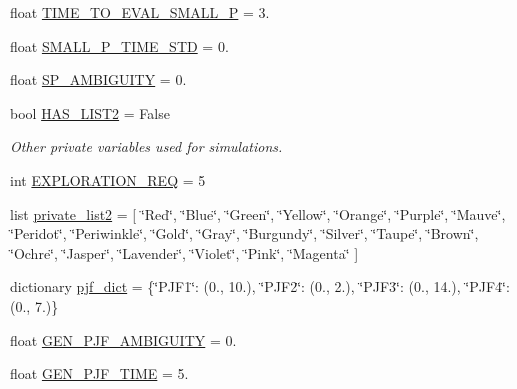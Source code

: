 \begin{DoxyCompactItemize}
float \hyperlink{namespacedynamicfilterapp_1_1toggles_a39ed9966eb905f0836938f04b4b45a05}{T\+I\+M\+E\+\_\+\+T\+O\+\_\+\+E\+V\+A\+L\+\_\+\+S\+M\+A\+L\+L\+\_\+P} = 3.
\item 
float \hyperlink{namespacedynamicfilterapp_1_1toggles_a37bbf61d53811dc1c3968535661346d5}{S\+M\+A\+L\+L\+\_\+\+P\+\_\+\+T\+I\+M\+E\+\_\+\+S\+TD} = 0.
\item 
float \hyperlink{namespacedynamicfilterapp_1_1toggles_a011a3c757a38e684057881c09a3ea686}{S\+P\+\_\+\+A\+M\+B\+I\+G\+U\+I\+TY} = 0.
\item 
bool \hyperlink{namespacedynamicfilterapp_1_1toggles_adf87f452eba2d6c6c2294f74e9ae4e6a}{H\+A\+S\+\_\+\+L\+I\+S\+T2} = False
\begin{DoxyCompactList}\small\item\em Other private variables used for simulations. \end{DoxyCompactList}\item 
int \hyperlink{namespacedynamicfilterapp_1_1toggles_a7a44c9548fafdbeed5cc966f6897a2fc}{E\+X\+P\+L\+O\+R\+A\+T\+I\+O\+N\+\_\+\+R\+EQ} = 5
\item 
list \hyperlink{namespacedynamicfilterapp_1_1toggles_a2d9a68d456cf74dea9d121633b9d0942}{private\+\_\+list2} = \mbox{[} \char`\"{}Red\char`\"{}, \char`\"{}Blue\char`\"{}, \char`\"{}Green\char`\"{}, \char`\"{}Yellow\char`\"{}, \char`\"{}Orange\char`\"{}, \char`\"{}Purple\char`\"{}, \char`\"{}Mauve\char`\"{}, \char`\"{}Peridot\char`\"{}, \char`\"{}Periwinkle\char`\"{}, \char`\"{}Gold\char`\"{}, \char`\"{}Gray\char`\"{}, \char`\"{}Burgundy\char`\"{}, \char`\"{}Silver\char`\"{}, \char`\"{}Taupe\char`\"{}, \char`\"{}Brown\char`\"{}, \char`\"{}Ochre\char`\"{}, \char`\"{}Jasper\char`\"{}, \char`\"{}Lavender\char`\"{}, \char`\"{}Violet\char`\"{}, \char`\"{}Pink\char`\"{}, \char`\"{}Magenta\char`\"{} \mbox{]}
\item 
dictionary \hyperlink{namespacedynamicfilterapp_1_1toggles_ad63ab815953799c46a2af16c2961e907}{pjf\+\_\+dict} = \{\char`\"{}P\+J\+F1\char`\"{}\+: (0., 10.), \char`\"{}P\+J\+F2\char`\"{}\+: (0., 2.), \char`\"{}P\+J\+F3\char`\"{}\+: (0., 14.), \char`\"{}P\+J\+F4\char`\"{}\+: (0., 7.)\}
\item 
float \hyperlink{namespacedynamicfilterapp_1_1toggles_a9da04dbf32dbd4361d7b76531b65eb89}{G\+E\+N\+\_\+\+P\+J\+F\+\_\+\+A\+M\+B\+I\+G\+U\+I\+TY} = 0.
\item 
float \hyperlink{namespacedynamicfilterapp_1_1toggles_a39f595a7fd2eeddb13903a0e9b1f5c5f}{G\+E\+N\+\_\+\+P\+J\+F\+\_\+\+T\+I\+ME} = 5.

\end{DoxyCompactItemize}

